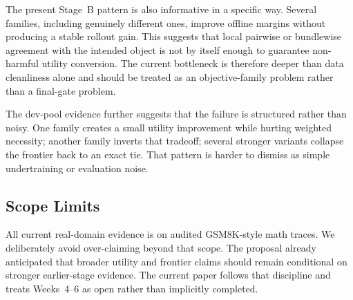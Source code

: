 The present Stage~B pattern is also informative in a specific way. Several families, including genuinely different ones, improve offline margins without producing a stable rollout gain. This suggests that local pairwise or bundlewise agreement with the intended object is not by itself enough to guarantee non-harmful utility conversion. The current bottleneck is therefore deeper than data cleanliness alone and should be treated as an objective-family problem rather than a final-gate problem.

The dev-pool evidence further suggests that the failure is structured rather than noisy. One family creates a small utility improvement while hurting weighted necessity; another family inverts that tradeoff; several stronger variants collapse the frontier back to an exact tie. That pattern is harder to dismiss as simple undertraining or evaluation noise.

\subsection{Scope Limits}

All current real-domain evidence is on audited GSM8K-style math traces. We deliberately avoid over-claiming beyond that scope. The proposal already anticipated that broader utility and frontier claims should remain conditional on stronger earlier-stage evidence. The current paper follows that discipline and treats Weeks~4--6 as open rather than implicitly completed.
